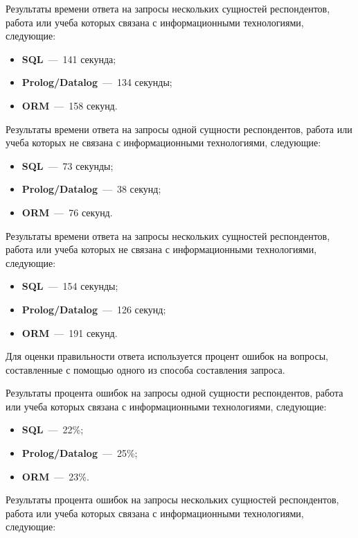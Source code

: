 Результаты времени ответа на запросы нескольких сущностей респондентов, работа или учеба которых связана с информационными технологиями, следующие:

\begin{itemize}
	\item \textbf{SQL}~---~141 секунда;
	\item \textbf{Prolog/Datalog}~---~134 секунды;
	\item \textbf{ORM}~---~158 секунд.
\end{itemize}

Результаты времени ответа на запросы одной сущности респондентов, работа или учеба которых не связана с информационными технологиями, следующие:

\begin{itemize}
	\item \textbf{SQL}~---~73 секунды;
	\item \textbf{Prolog/Datalog}~---~38 секунд;
	\item \textbf{ORM}~---~76 секунд.
\end{itemize}

Результаты времени ответа на запросы нескольких сущностей респондентов, работа или учеба которых не связана с информационными технологиями, следующие:

\begin{itemize}
	\item \textbf{SQL}~---~154 секунды;
	\item \textbf{Prolog/Datalog}~---~126 секунд;
	\item \textbf{ORM}~---~191 секунд.
\end{itemize}

Для оценки правильности ответа используется процент ошибок на вопросы, составленные с помощью одного из способа составления запроса. 

Результаты процента ошибок на запросы одной сущности респондентов, работа или учеба которых связана с информационными технологиями, следующие:

\begin{itemize}
	\item \textbf{SQL}~---~22\%;
	\item \textbf{Prolog/Datalog}~---~25\%;
	\item \textbf{ORM}~---~23\%.
\end{itemize}

Результаты процента ошибок на запросы нескольких сущностей респондентов, работа или учеба которых связана с информационными технологиями, следующие:

